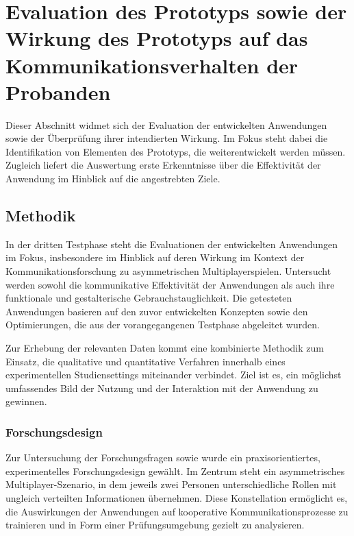 \chapter{Evaluation des Prototyps sowie der Wirkung des Prototyps auf das Kommunikationsverhalten der Probanden} \label{sec:study}

Dieser Abschnitt widmet sich der Evaluation der entwickelten Anwendungen sowie der Überprüfung ihrer intendierten Wirkung. Im Fokus steht dabei die Identifikation von Elementen des Prototyps, die weiterentwickelt werden müssen. Zugleich liefert die Auswertung erste Erkenntnisse über die Effektivität der Anwendung im Hinblick auf die angestrebten Ziele.


\section{Methodik}

In der dritten Testphase steht die Evaluationen der entwickelten Anwendungen im Fokus, insbesondere im Hinblick auf deren Wirkung im Kontext der Kommunikationsforschung zu asymmetrischen Multiplayerspielen. Untersucht werden sowohl die kommunikative Effektivität der Anwendungen als auch ihre funktionale und gestalterische Gebrauchstauglichkeit. Die getesteten Anwendungen basieren auf den zuvor entwickelten Konzepten sowie den Optimierungen, die aus der vorangegangenen Testphase abgeleitet wurden.

Zur Erhebung der relevanten Daten kommt eine kombinierte Methodik zum Einsatz, die qualitative und quantitative Verfahren innerhalb eines experimentellen Studiensettings miteinander verbindet. Ziel ist es, ein möglichst umfassendes Bild der Nutzung und der Interaktion mit der Anwendung zu gewinnen.

\subsection{Forschungsdesign}

Zur Untersuchung der Forschungsfragen   sowie  wurde ein praxisorientiertes, experimentelles Forschungsdesign gewählt. Im Zentrum steht ein asymmetrisches Multiplayer-Szenario, in dem jeweils zwei Personen unterschiedliche Rollen mit ungleich verteilten Informationen übernehmen. Diese Konstellation ermöglicht es, die Auswirkungen der Anwendungen auf kooperative Kommunikationsprozesse zu trainieren und in Form einer Prüfungsumgebung gezielt zu analysieren.

